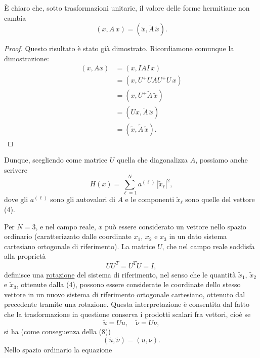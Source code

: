 \documentclass[11pt, a4paper]{book}
\numberwithin{equation}{section}
\begin{document}
È chiaro che, sotto trasformazioni unitarie, il valore delle forme
hermitiane non cambia
\begin{equation}
(x, A\,x) = (\widetilde{x}, \widetilde{A}\,\widetilde{x}).
\end{equation}


\begin{proof}
Questo risultato è stato già dimostrato. Ricordiamone comunque la
dimostrazione:
\begin{align*}
(x, Ax) &= (x, IAI\,x) \\
        &= (x, U^+UAU^+U\,x) \\
        &= (x, U^+\widetilde{A}\,\widetilde{x}) \\
        &= (Ux, \widetilde{A}\,\widetilde{x}) \\
        &= (\widetilde{x}, \widetilde{A}\,\widetilde{x}).
\end{align*}
\end{proof}

Dunque, scegliendo come matrice $U$ quella che diagonalizza $A$, possiamo
anche scrivere
\begin{equation}
H(x) = \sum_{\ell=1}^{N} a^{(\ell)}\,|\widetilde{x}_\ell|^2,
\end{equation}
dove gli $a^{(\ell)}$ sono gli autovalori di $A$ e le componenti
$\widetilde{x}_\ell$ sono quelle del vettore (4).

Per $N = 3$, e nel campo reale, $x$ può essere considerato un vettore nello
spazio ordinario (caratterizzato dalle coordinate $x_1$, $x_2$ e $x_3$ in
un dato sistema cartesiano ortogonale di riferimento). La matrice $U$, che
nel campo reale soddisfa alla proprietà
\begin{equation}
UU^T = U^TU = I,
\end{equation}
definisce una \underline{rotazione} del sistema di riferimento, nel senso
che le quantità $\widetilde{x}_1$, $\widetilde{x}_2$ e $\widetilde{x}_3$,
ottenute dalla (4), possono essere considerate le coordinate dello stesso
vettore in un nuovo sistema di riferimento ortogonale cartesiano, ottenuto
dal precedente tramite una rotazione. Questa interpretazione è consentita
dal fatto che la trasformazione in questione conserva i prodotti scalari fra
vettori, cioè se
\[
\widetilde{u} = Uu, \quad \widetilde{\nu} = U\nu,
\]
si ha (come conseguenza della (8))
\[
(\widetilde{u}, \widetilde{\nu}) = (u, \nu).
\]
Nello spazio ordinario la equazione

\end{document}
